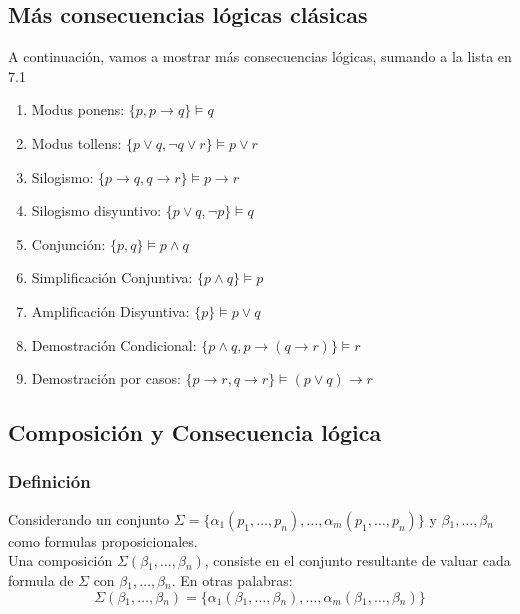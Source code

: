 \documentclass{article}
\begin{document}
\subsection{Más consecuencias lógicas clásicas}
A continuación, vamos a mostrar más consecuencias lógicas, sumando a la lista en 7.1
\begin{enumerate}
    \item Modus ponens: $ \{ p, p \rightarrow{} q \} \models{} q $
    \item Modus tollens: $\{ p \vee{} q, \neg{} q \vee{} r \} \models{} p \vee{} r$
    \item Silogismo: $\{ p \rightarrow{} q, q \rightarrow{} r \} \models{} p \rightarrow{} r$
    \item Silogismo disyuntivo: $\{ p \vee{} q, \neg{} p \} \models{} q$
    \item Conjunción: $\{ p, q \} \models{} p \wedge{} q$
    \item Simplificación Conjuntiva: $\{ p \wedge{} q \} \models p$
    \item Amplificación Disyuntiva: $ \{ p \} \models{} p \vee{} q$
    \item Demostración Condicional: $\{ p \wedge{} q, p \rightarrow{} (q \rightarrow{} r) \} \models{} r$
    \item Demostración por casos: $\{ p \rightarrow{} r, q \rightarrow{} r \} \models (p \vee{} q) \rightarrow{} r$
\end{enumerate}

\subsection{Composición y Consecuencia lógica}
\subsubsection{Definición}
Considerando un conjunto $\Sigma{} = \{ \alpha{}_{1}(p_{1}, \ldots{}, p_{n}), \ldots{}, \alpha{}_{m}(p_{1}, \ldots{}, p_{n}) \}$ y $\beta{}_{1}, \ldots{}, \beta{}_{n}$ como formulas proposicionales.\\
Una composición $\Sigma{}(\beta{}_{1}, \ldots{}, \beta{}_{n})$, consiste en el conjunto resultante de valuar cada formula de $\Sigma$ con $\beta{}_{1}, \ldots{}, \beta{}_{n}$. En otras palabras:\\
\large $$\Sigma{}(\beta{}_{1}, \ldots{}, \beta{}_{n}) = \{ \alpha{}_{1}(\beta{}_{1}, \ldots{}, \beta{}_{n}), \ldots{}, \alpha{}_{m}(\beta{}_{1}, \ldots{}, \beta{}_{n}) \}$$
\normalsize
\end{document}

